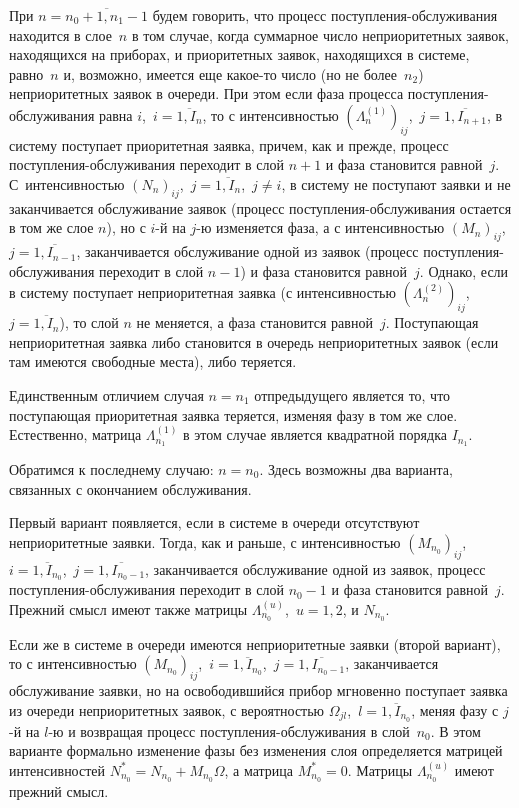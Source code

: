 \begin{multicols}{2}
При $n=\overline{n_0+1,n_1-1}$ будем говорить, что процесс
поступления-обслуживания находится в слое~$n$ в том случае, когда
суммарное число неприоритетных заявок, находящихся на приборах, и
приоритетных заявок, находящихся в системе, равно~$n$
и, возможно, имеется еще ка\-кое-то число (но не более~$n_2$)
неприоритетных заявок в очереди.
При этом если фаза процесса поступления-обслуживания равна
$i$,\  $i=\overline{1,I_n}$, то с интенсивностью
$(\Lambda^{(1)}_n)_{ij}$,\  $j=\overline{1,I_{n+1}}$,
в систему поступает приоритетная заявка, причем, как и прежде,
процесс по\-ступ\-ле\-ния-об\-слу\-жи\-ва\-ния переходит в слой $n+1$
и фаза становится равной~$j$.
С~интенсивностью $(N_n)_{ij}$,\  $j=\overline{1,I_n}$,\  $j\ne i$,
в систему не поступают заявки и не заканчивается обслуживание
заявок (процесс по\-ступ\-ле\-ния-об\-слу\-живания остается в том же
слое $n$), но с $i$-й на $j$-ю изменяется фаза, а с интенсивностью
$(M_n)_{ij}$,\  $j=\overline{1,I_{n-1}}$, заканчивается обслуживание
одной из заявок (процесс по\-ступ\-ле\-ния-об\-слу\-жи\-ва\-ния переходит в слой
$n-1$) и фаза становится равной~$j$.
Однако, если в систему поступает неприоритетная заявка
(с интенсивностью $(\Lambda^{(2)}_n)_{ij}$,\  $j=\overline{1,I_n}$),
то слой $n$ не меняется, а фаза становится равной~$j$.
Поступающая неприоритетная заявка либо становится в очередь
неприоритетных заявок (если там имеются свободные места),
либо теряется.

Единственным отличием случая $n=n_1$ от\linebreak предыду\-ще\-го является
то, что поступающая приоритетная заявка теряется, изменяя фазу в
том же слое.
Естественно, матрица $\Lambda^{(1)}_{n_1}$ в этом случае
является квадратной порядка $I_{n_1}$.

Обратимся к последнему случаю: $n=n_0$.
Здесь возможны два варианта, связанных с окончанием обслуживания.

Первый вариант появляется, если в системе в очереди отсутствуют
неприоритетные заявки.
Тогда, как и раньше, с интенсивностью $(M_{n_0})_{ij}$,\ 
$i=\overline{1,I_{n_0}}$,\  $j=\overline{1,I_{n_0-1}}$, заканчивается
обслуживание одной из заявок, процесс по\-ступ\-ле\-ния-об\-слу\-жи\-ва\-ния
переходит в слой $n_0-1$ и фаза становится равной~$j$.
Прежний смысл имеют также матрицы $\Lambda^{(u)}_{n_0}$,\ $u=1,2$,
и $N_{n_0}$.

Если же в системе в очереди имеются неприоритетные заявки
(второй вариант), то с интенсивностью $(M_{n_0})_{ij}$,\
$i=\overline{1,I_{n_0}}$,\ $j=\overline{1,I_{n_0-1}}$,\linebreak
заканчивается обслуживание заявки, но на освободившийся прибор
мгновенно поступает заявка из очереди неприоритетных заявок,
с вероятностью $\Omega_{jl}$,\ $l=\overline{1,I_{n_0}}$,
меняя фазу с $j$-й на $l$-ю и возвращая процесс
по\-ступ\-ле\-ния-об\-слу\-жи\-ва\-ния в слой~$n_0$.
В этом варианте формально изменение фазы без изменения слоя
определяется матрицей интенсивностей $N^*_{n_0}=N_{n_0}+M_{n_0}\Omega$,
а матрица $M^*_{n_0}=0$.
Матрицы $\Lambda^{(u)}_{n_0}$ имеют прежний смысл.


\end{multicols}
